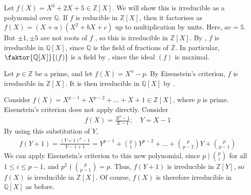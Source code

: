 \begin{example}
	Let $f(X) = X^3 + 2X + 5 \in \mathbb Z[X]$.
	We will show this is irreducible as a polynomial over $\mathbb Q$.
	If $f$ is reducible in $\mathbb Z[X]$, then it factorises as $f(X) = (X+a)(X^2 + bX + c)$ up to multiplication by units.
	Here, $ac = 5$.
	But $\pm 1, \pm 5$ are not roots of $f$ \Lightning, so this is irreducible in $\mathbb Z[X]$.
	By , $f$ is irreducible in $\mathbb Q[X]$, since $\mathbb Q$ is the field of fractions of $\mathbb Z$.
	In particular, $\faktor{\mathbb Q[X]}{(f)}$ is a field by , since the ideal $(f)$ is maximal.
\end{example}

\begin{example}
	Let $p \in \mathbb Z$ be a prime, and let $f(X) = X^n - p$.
	By Eisenstein's criterion, $f$ is irreducible in $\mathbb Z[X]$.
	It is then irreducible in $\mathbb Q[X]$ by .
\end{example}

\begin{example}
	Consider $f(X) = X^{p-1} + X^{p-2} + \dots + X + 1 \in \mathbb Z[X]$, where $p$ is prime.
	Eisenstein's criterion does not apply directly.
	Consider
	\begin{align*}
		f(X) = \frac{X^p - 1}{X - 1};\quad Y = X - 1
	\end{align*}
	By using this substitution of $Y$,
	\begin{align*}
		f(Y+1) = \frac{(Y+1)^p - 1}{Y-1 + 1} = Y^{p-1} + \binom{p}{1} Y^{p-2} + \dots + \binom{p}{p-2} Y + \binom{p}{p-1}
	\end{align*}
	We can apply Eisenstein's criterion to this new polynomial, since $p \mid \binom{p}{i}$ for all $1 \leq i \leq p - 1$, and $p^2 \nmid \binom{p}{p-1} = p$.
	Thus, $f(Y+1)$ is irreducible in $\mathbb Z[Y]$, so $f(X)$ is irreducible in $\mathbb Z[X]$.
	Of course, $f(X)$ is therefore irreducible in $\mathbb Q[X]$ as before.
\end{example}

